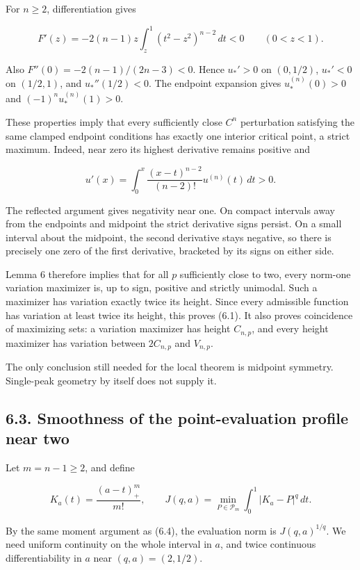 \documentclass[11pt]{article}
\begin{document}
For \(n\ge2\), differentiation gives

\[
F'(z)=-2(n-1)z\int_z^1(t^2-z^2)^{n-2}\,dt<0
\qquad(0<z<1).
\tag{6.8}
\]

Also \(F''(0)=-2(n-1)/(2n-3)<0\). Hence \(u_*'>0\) on \((0,1/2)\),
\(u_*'<0\) on \((1/2,1)\), and \(u_*''(1/2)<0\). The endpoint expansion
gives \(u_*^{(n)}(0)>0\) and \((-1)^nu_*^{(n)}(1)>0\).

These properties imply that every sufficiently close \(C^n\)
perturbation satisfying the same clamped endpoint conditions has exactly
one interior critical point, a strict maximum. Indeed, near zero its
highest derivative remains positive and

\[
u'(x)=\int_0^x\frac{(x-t)^{n-2}}{(n-2)!}u^{(n)}(t)\,dt>0.
\tag{6.9}
\]

The reflected argument gives negativity near one. On compact intervals
away from the endpoints and midpoint the strict derivative signs
persist. On a small interval about the midpoint, the second derivative
stays negative, so there is precisely one zero of the first derivative,
bracketed by its signs on either side.

Lemma 6 therefore implies that for all \(p\) sufficiently close to two,
every norm-one variation maximizer is, up to sign, positive and strictly
unimodal. Such a maximizer has variation exactly twice its height. Since
every admissible function has variation at least twice its height, this
proves (6.1). It also proves coincidence of maximizing sets: a variation
maximizer has height \(C_{n,p}\), and every height maximizer has
variation between \(2C_{n,p}\) and \(V_{n,p}\).

The only conclusion still needed for the local theorem is midpoint
symmetry. Single-peak geometry by itself does not supply it.

\subsection{6.3. Smoothness of the point-evaluation profile near
two}\label{smoothness-of-the-point-evaluation-profile-near-two}

Let \(m=n-1\ge2\), and define

\[
K_a(t)=\frac{(a-t)_+^m}{m!},\qquad
J(q,a)=\min_{P\in\mathcal P_m}\int_0^1|K_a-P|^q\,dt.
\tag{6.10}
\]

By the same moment argument as (6.4), the evaluation norm is
\(J(q,a)^{1/q}\). We need uniform continuity on the whole interval in
\(a\), and twice continuous differentiability in \(a\) near
\((q,a)=(2,1/2)\).
\end{document}
